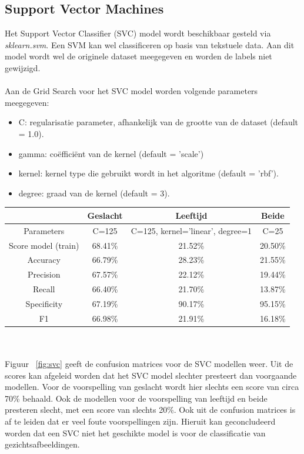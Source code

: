 \subsection{Support Vector Machines} \label{sub:poc-svm}
Het Support Vector Classifier (SVC) model wordt beschikbaar gesteld via \textit{sklearn.svm}. Een SVM kan wel classificeren op basis van tekstuele data. Aan dit model wordt wel de originele dataset meegegeven en worden de labels niet gewijzigd. \\
\\
Aan de Grid Search voor het SVC model worden volgende parameters meegegeven:
\begin{itemize}
    \item C: regularisatie parameter, afhankelijk van de grootte van de dataset (default = 1.0).
    \item gamma: coëfficiënt van de kernel (default = 'scale')
    \item kernel: kernel type die gebruikt wordt in het algoritme (default = 'rbf').
    \item degree: graad van de kernel (default = 3).
\end{itemize}
\begin{center}
    \begin{tabular}{||c | c | c | c||} 
        \hline
        & Geslacht & Leeftijd & Beide  \\ 
        \hline
        Parameters & C=125 &  C=125, kernel='linear', degree=1 & C=25  \\ 
        \hline
        Score model (train) & 68.41\% & 21.52\% & 20.50\%  \\
        \hline
        Accuracy & 66.79\% & 28.23\% & 21.55\%  \\
        \hline
        Precision & 67.57\% & 22.12\% & 19.44\%  \\
        \hline
        Recall & 66.40\% & 21.70\% & 13.87\%  \\
        \hline
        Specificity & 67.19\% & 90.17\% & 95.15\% \\
        \hline
        F1 & 66.98\% & 21.91\% & 16.18\%  \\
       
    \end{tabular}
\end{center}
\\
\\
Figuur ~\ref{fig:svc} geeft de confusion matrices voor de SVC modellen weer. Uit de scores kan afgeleid worden dat het SVC model slechter presteert dan voorgaande modellen. Voor de voorspelling van geslacht wordt hier slechts een score van circa 70\% behaald. Ook de modellen voor de voorspelling van leeftijd en beide presteren slecht, met een score van slechts 20\%. Ook uit de confusion matrices is af te leiden dat er veel foute voorspellingen zijn. Hieruit kan geconcludeerd worden dat een SVC niet het geschikte model is voor de classificatie van gezichtsafbeeldingen. 

